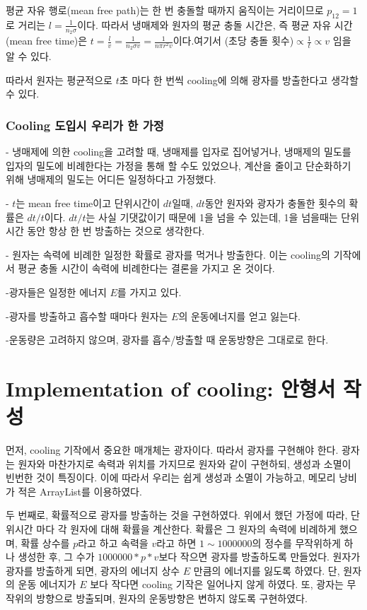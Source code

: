 \documentclass{gshs-hutech}
\begin{document}
평균 자유 행로(mean free path)는 한 번 충돌할 때까지 움직이는 거리이므로 $p_{12}=1$로 거리는 $l=\frac{1}{n_2\sigma}$이다. 따라서 냉매제와 원자의 평균 충돌 시간은, 즉 평균 자유 시간(mean free time)은 $t=\frac{l}{v}=\frac{1}{n_2\sigma v}=\frac{1}{n\pi r^2v}$이다.여기서 (초당 충돌 횟수)$\propto \frac{1}{t} \propto v$ 임을 알 수 있다.

따라서 원자는 평균적으로 $t$초 마다 한 번씩 cooling에 의해 광자를 방출한다고 생각할 수 있다. 

\subsubsection{Cooling 도입시 우리가 한 가정}

- 냉매제에 의한 cooling을 고려할 때, 냉매제를 입자로 집어넣거나, 냉매제의 밀도를 입자의 밀도에 비례한다는 가정을 통해 할 수도 있었으나, 계산을 줄이고 단순화하기 위해 냉매제의 밀도는 어디든 일정하다고 가정했다.  

- $t$는 mean free time이고 단위시간이 $dt$일때, $dt$동안 원자와 광자가 충돌한 횟수의 확률은 $dt/t$이다. $dt/t$는 사실 기댓값이기 때문에 1을 넘을 수 있는데, 1을 넘을때는 단위시간 동안 항상 한 번 방출하는 것으로 생각한다.

- 원자는 속력에 비례한 일정한 확률로 광자를 먹거나 방출한다.
이는 cooling의 기작에서 평균 충돌 시간이 속력에 비례한다는 결론을 가지고 온 것이다.

-광자들은 일정한 에너지 $E$를 가지고 있다.

-광자를 방출하고 흡수할 때마다 원자는 $E$의 운동에너지를 얻고 잃는다.

-운동량은 고려하지 않으며, 광자를 흡수/방출할 때 운동방향은 그대로로 한다.


\section{Implementation of cooling: 안형서 작성} \label{implementation_cooling} 

먼저, cooling 기작에서 중요한 매개체는 광자이다. 따라서 광자를 구현해야 한다. 광자는 원자와 마찬가지로 속력과 위치를 가지므로 원자와 같이 구현하되, 생성과 소멸이 빈번한 것이 특징이다. 이에 따라서 우리는 쉽게 생성과 소멸이 가능하고, 메모리 낭비가 적은 ArrayList를 이용하였다. 

두 번째로, 확률적으로 광자를 방출하는 것을 구현하였다. 위에서 했던 가정에 따라, 단위시간 마다 각 원자에 대해 확률을 계산한다. 확률은 그 원자의 속력에 비례하게 했으며, 확률 상수를 $p$라고 하고 속력을 $v$라고 하면 $1\sim 1000000$의 정수를 무작위하게 하나 생성한 후, 그 수가 $1000000*p*v$보다 작으면 광자를 방출하도록 만들었다. 원자가 광자를 방출하게 되면, 광자의 에너지 상수 $E$ 만큼의 에너지를 잃도록 하였다. 단, 원자의 운동 에너지가 $E$ 보다 작다면 cooling 기작은 일어나지 않게 하였다. 또, 광자는 무작위의 방향으로 방출되며, 원자의 운동방향은 변하지 않도록 구현하였다.  
\end{document}
